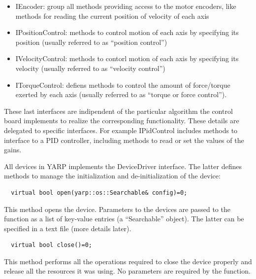 \begin{itemize}

\item IEncoder: group all methods providing access to the motor encoders, like methods
for reading the current position of velocity of each axis

\item IPositionControl: methods to control motion of each axis by specifying its 
position (usually referred to as ``position control'')

\item IVelocityControl: methods to contorl motion of each axis by specifying its 
velocity (usually referred to as ``velocity control'')

\item ITorqueControl: defiens methods to control the amount of force/torque exerted 
by each axis (usually referred to as ``torque or force control'').

\end{itemize}

These last interfaces are indipendent of the particular algorithm the control
board implements to realize the corresponding functionality. These details are 
delegated to specific interfaces. For example IPidControl includes methods to 
interface to a PID controller, including methods to read or set the values of the 
gains.

All devices in YARP implements the DeviceDriver interface. The latter defines 
methods to manage the initialization and de-initialization of the device: 

\begin{verbatim}
  virtual bool open(yarp::os::Searchable& config)=0;
\end{verbatim}

This method opens the device. Parameters to the devices are passed to the
function as a list of key-value entries (a ``Searchable'' object). The latter 
can be specified in a text file (more details later).

\begin{verbatim}
  virtual bool close()=0;
\end{verbatim}

This method performs all the operations required to close the 
device properly and release all the resources it was using. No
parameters are required by the function.

